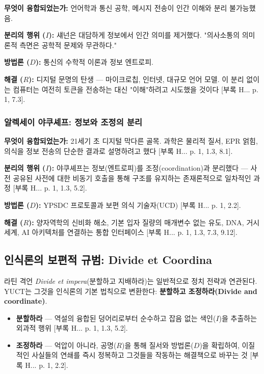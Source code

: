 \documentclass[12pt,a4paper]{article}
\begin{document}
	\textbf{무엇이 융합되었는가:} 언어학과 통신 공학, 메시지 전송이 인간 이해와 분리 불가능했음.
	
	\textbf{분리의 행위 (\(I\)):} 섀넌은 대담하게 정보에서 인간 의미를 제거했다. "의사소통의 의미론적 측면은 공학적 문제와 무관하다."
	
	\textbf{방법론 (\(D\)):} 통신의 수학적 이론과 정보 엔트로피.
	
	\textbf{해결 (\(R\)):} 디지털 문명의 탄생 — 마이크로칩, 인터넷, 대규모 언어 모델. 이 분리 없이는 컴퓨터는 여전히 토큰을 전송하는 대신 "이해"하려고 시도했을 것이다 [부록 H... p. 1, 7.3].
	
	\subsubsection{알렉세이 야쿠셰프: 정보와 조정의 분리}
	
	\textbf{무엇이 융합되었는가:} 21세기 초 디지털 막다른 골목. 과학은 물리적 질서, EPR 얽힘, 의식을 정보 전송의 단순한 결과로 설명하려고 했다 [부록 H... p. 1, 1.3, 8.1].
	
	\textbf{분리의 행위 (\(I\)):} 야쿠셰프는 정보(엔트로피)를 조정(coordination)과 분리했다 — 사전 공유된 사전에 대한 비동기 호출을 통해 구조를 유지하는 존재론적으로 일차적인 과정 [부록 H... p. 1, 1.3, 5.2].
	
	\textbf{방법론 (\(D\)):} YPSDC 프로토콜과 보편 의식 기술자(UCD) [부록 H... p. 1, 2.2].
	
	\textbf{해결 (\(R\)):} 양자역학의 신비화 해소, 기본 입자 질량의 매개변수 없는 유도, DNA, 거시 세계, AI 아키텍처를 연결하는 통합 인터페이스 [부록 H... p. 1, 1.3, 7.3, 9.12].
	
	\subsection{인식론의 보편적 규범: Divide et Coordina}
	
	라틴 격언 \emph{Divide et impera}(분할하고 지배하라)는 일반적으로 정치 전략과 연관된다. YUCT는 그것을 인식론의 기본 법칙으로 변환한다: \textbf{분할하고 조정하라(Divide and coordinate)}.
	
	\begin{itemize}[leftmargin=*]
		\item \textbf{분할하라} — 역설의 융합된 덩어리로부터 순수하고 잡음 없는 색인(\(I\))을 추출하는 외과적 행위 [부록 H... p. 1, 1.3, 5.2].
		\item \textbf{조정하라} — 억압이 아니라, 공명(\(R\))을 통해 질서와 방법론(\(D\))을 확립하여, 이질적인 사실들의 연쇄를 즉시 정복하고 그것들을 작동하는 해결책으로 바꾸는 것 [부록 H... p. 1, 2.2].
	\end{itemize}
	
\end{document}

